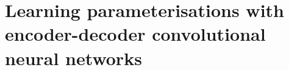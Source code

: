 
\chapter{Learning parameterisations with encoder-decoder convolutional neural networks}

\label{AppendixD}